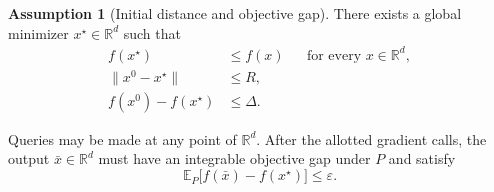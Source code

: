 \documentclass[10pt]{article}
\theoremstyle{definition}
\newtheorem{assumption}{Assumption}
\begin{document}
\begin{assumption}[Initial distance and objective gap]
There exists a global minimizer $x^\star\in\mathbb{R}^d$ such that
\[
\begin{aligned}
f(x^\star)&\leq f(x) &&\text{for every }x\in\mathbb{R}^d,\\
\|x^0-x^\star\|&\leq R,\\
f(x^0)-f(x^\star)&\leq\Delta.
\end{aligned}
\]
\end{assumption}

Queries may be made at any point of $\mathbb{R}^d$. After the allotted gradient calls, the output $\bar{x}\in\mathbb{R}^d$ must have an integrable objective gap under $P$ and satisfy
\[
\mathbb{E}_{P}\bigl[f(\bar{x})-f(x^\star)\bigr]
\leq\varepsilon.
\]
\end{document}

